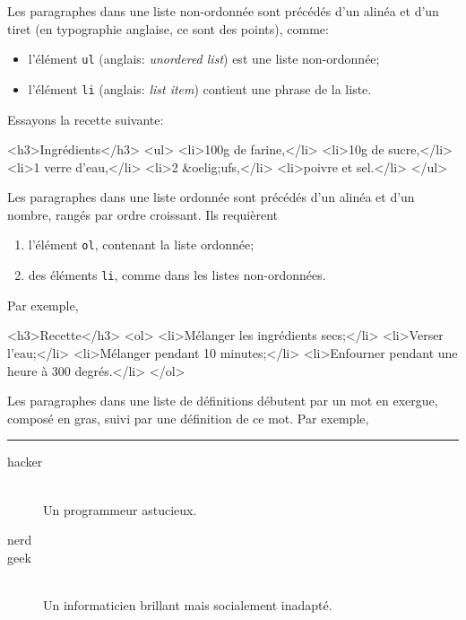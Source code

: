 Les paragraphes dans une liste non-ordonnée sont précédés d'un alinéa
et d'un tiret (en typographie anglaise, ce sont des points), comme:
\begin{itemize}

  \item l'élément \texttt{ul} (anglais: \emph{unordered list}) est
  une liste non-ordonnée;

  \item l'élément \texttt{li} (anglais: \emph{list item}) contient une
    phrase de la liste.

\end{itemize}
Essayons la recette suivante:
\begin{sverb}
<h3>Ingrédients</h3>
<ul>
  <li>100g de farine,</li>
  <li>10g de sucre,</li>
  <li>1 verre d'eau,</li>
  <li>2 &oelig;ufs,</li>
  <li>poivre et sel.</li>
</ul>
\end{sverb}
Les paragraphes dans une liste ordonnée sont précédés d'un alinéa et
d'un nombre, rangés par ordre croissant. Ils requièrent
\begin{enumerate}

  \item l'élément \texttt{ol}, contenant la liste ordonnée;

  \item des éléments \texttt{li}, comme dans les listes non-ordonnées.

\end{enumerate}
Par exemple,
\begin{sverb}
<h3>Recette</h3>
<ol>
  <li>Mélanger les ingrédients secs;</li>
  <li>Verser l'eau;</li>
  <li>Mélanger pendant 10 minutes;</li>
  <li>Enfourner pendant une heure à 300 degrés.</li>
</ol>
\end{sverb}
Les paragraphes dans une liste de définitions débutent par un mot en
exergue, composé en gras, suivi par une définition de ce mot. Par
exemple,
\noindent\rule{\linewidth}{0.5pt}
\begin{description}

  \item[hacker]\ \\
    Un programmeur astucieux.

  \item[nerd]

  \item[geek]\ \\
    Un informaticien brillant mais socialement inadapté.

\end{description}
